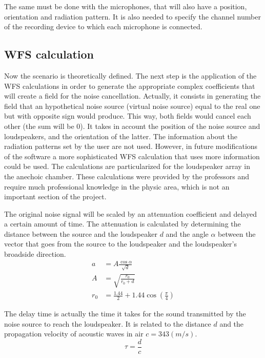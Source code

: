 The same must be done with the microphones, that will also have a position, orientation and radiation pattern. It is also needed to specify the channel number of the recording device to which each microphone is connected.
 
\subsection{WFS calculation}
\label{WFScalculation}

Now the scenario is theoretically defined. The next step is the application of the WFS calculations in order to generate the appropriate complex coefficients that will create a field for the noise cancellation. Actually, it consists in generating the field that an hypothetical noise source (virtual noise source) equal to the real one but with opposite sign would produce. This way, both fields would cancel each other (the sum will be $0$). It takes in account the position of the noise source and loudspeakers, and the orientation of the latter. The information about the radiation patterns set by the user are not used. However, in future modifications of the software a more sophisticated WFS calculation that uses more information could be used. The calculations are particularized for the loudspeaker array in the anechoic chamber. These calculations were provided by the professors and require much professional knowledge in the physic area, which is not an important section of the project.

The original noise signal will be scaled by an attenuation coefficient and delayed a certain amount of time. The attenuation is calculated by determining the distance between the source and the loudspeaker $d$ and the angle $\alpha$ between the vector that goes from the source to the loudspeaker and the loudspeaker's broadside direction.
\begin{equation}
\begin{aligned}
a &= A\frac{\cos\alpha}{\sqrt{d}} \\
A &= \sqrt{\frac{r_0}{r_0 + d}}\\
r_0 &= \frac{1.44}{2} + 1.44 \cos\left( \frac{\pi}{4} \right)
\end{aligned}
\label{WFScalcEqObsolete}
\end{equation}

The delay time is actually the time it takes for the sound transmitted by the noise source to reach the loudspeaker. It is related to the distance $d$ and the propagation velocity of acoustic waves in air $c = 343 (m/s)$.
\begin{equation}
\tau = \frac{d}{c} \label{WFScalcEqDelayObsolete}
\end{equation}

